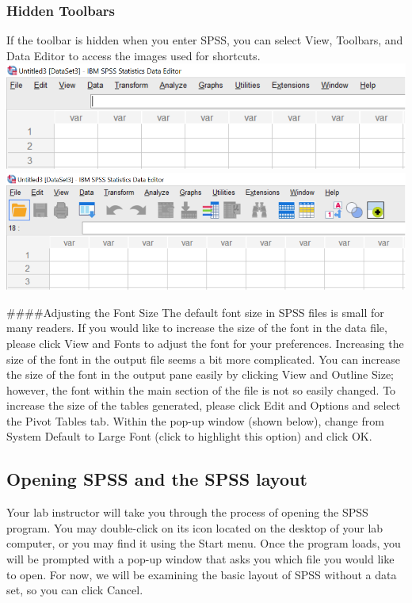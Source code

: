\documentclass[
]{book}
\begin{document}
\hypertarget{hidden-toolbars}{%
\subsubsection{Hidden Toolbars}\label{hidden-toolbars}}

If the toolbar is hidden when you enter SPSS, you can select View, Toolbars, and Data Editor to access the images used for shortcuts.
\includegraphics{img/0.1.png}
\includegraphics{img/0.2.png}

\#\#\#\#Adjusting the Font Size
The default font size in SPSS files is small for many readers. If you would like to increase the size of the font in the data file, please click View and Fonts to adjust the font for your preferences. Increasing the size of the font in the output file seems a bit more complicated. You can increase the size of the font in the output pane easily by clicking View and Outline Size; however, the font within the main section of the file is not so easily changed. To increase the size of the tables generated, please click Edit and Options and select the Pivot Tables tab. Within the pop-up window (shown below), change from System Default to Large Font (click to highlight this option) and click OK.

\hypertarget{opening-spss-and-the-spss-layout}{%
\subsection{Opening SPSS and the SPSS layout}\label{opening-spss-and-the-spss-layout}}

Your lab instructor will take you through the process of opening the SPSS program. You may double-click on its icon located on the desktop of your lab computer, or you may find it using the Start menu. Once the program loads, you will be prompted with a pop-up window that asks you which file you would like to open. For now, we will be examining the basic layout of SPSS without a data set, so you can click {Cancel}.
\end{document}

